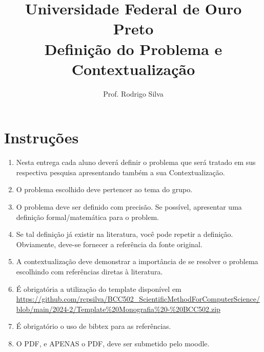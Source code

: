 \documentclass{article}
\title{\vspace{-2 cm}Universidade Federal de Ouro Preto \\ Definição do Problema e Contextualização}
\author{Prof. Rodrigo Silva}
\date{}
\begin{document}
\maketitle

\section*{Instruções}

\begin{enumerate}
    \item Nesta entrega cada aluno deverá definir o problema que será tratado em sus respectiva pesquisa apresentando também a sua Contextualização.
    \item O problema escolhido deve pertencer ao tema do grupo.
    \item O problema deve ser definido com precisão. Se possível, apresentar uma definição formal/matemática para o problem. 
    \item Se tal definição já existir na literatura, você pode repetir a definição. Obviamente, deve-se fornecer a referência da fonte original. 
    \item A contextualização deve demonstrar a importância de se resolver o problema escolhindo com referências diretas à literatura. 
    \item É obrigatória a utilização do template disponível em \url{https://github.com/rcpsilva/BCC502_ScientificMethodForComputerScience/blob/main/2024-2/Template%20Monografia%20-%20BCC502.zip}
    \item É obrigatório o uso de bibtex para as referências. 
    \item O PDF, e APENAS o PDF, deve ser submetido pelo moodle.  
\end{enumerate}    




%
%
\end{document}
